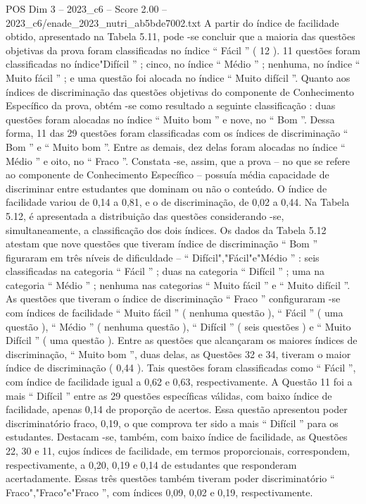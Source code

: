 \begin{textsample}{POS Dim 3 – 2023\_c6 – Score 2.00 – 2023\_c6/enade\_2023\_nutri\_ab5bde7002.txt}
A partir do índice de facilidade obtido, apresentado na Tabela 5.11, pode -se concluir que a maioria das questões objetivas da prova foram classificadas no índice “ Fácil ” ( 12 ). 11 questões foram classificadas no índice"Difícil ” ; cinco, no índice “ Médio ” ; nenhuma, no índice “ Muito fácil ” ; e uma questão foi alocada no índice “ Muito difícil ”.
Quanto aos índices de discriminação das questões objetivas do componente de Conhecimento Específico da prova, obtém -se como resultado a seguinte classificação : duas questões foram alocadas no índice “ Muito bom ” e nove, no “ Bom ”.
Dessa forma, 11 das 29 questões foram classificadas com os índices de discriminação “ Bom ” e “ Muito bom ”.
Entre as demais, dez delas foram alocadas no índice “ Médio ” e oito, no “ Fraco ”.
Constata -se, assim, que a prova – no que se refere ao componente de Conhecimento Específico – possuía média capacidade de discriminar entre estudantes que dominam ou não o conteúdo.
O índice de facilidade variou de 0,14 a 0,81, e o de discriminação, de 0,02 a 0,44.
Na Tabela 5.12, é apresentada a distribuição das questões considerando -se, simultaneamente, a classificação dos dois índices.
Os dados da Tabela 5.12 atestam que nove questões que tiveram índice de discriminação “ Bom ” figuraram em três níveis de dificuldade – “ Difícil","Fácil"e"Médio ” : seis classificadas na categoria “ Fácil ” ; duas na categoria “ Difícil ” ; uma na categoria “ Médio ” ; nenhuma nas categorias “ Muito fácil ” e “ Muito difícil ”.
As questões que tiveram o índice de discriminação “ Fraco ” configuraram -se com índices de facilidade “ Muito fácil ” ( nenhuma questão ), “ Fácil ” ( uma questão ), “ Médio ” ( nenhuma questão ), “ Difícil ” ( seis questões ) e “ Muito Difícil ” ( uma questão ).
Entre as questões que alcançaram os maiores índices de discriminação, “ Muito bom ”, duas delas, as Questões 32 e 34, tiveram o maior índice de discriminação ( 0,44 ).
Tais questões foram classificadas como “ Fácil ”, com índice de facilidade igual a 0,62 e 0,63, respectivamente.
A Questão 11 foi a mais “ Difícil ” entre as 29 questões específicas válidas, com baixo índice de facilidade, apenas 0,14 de proporção de acertos.
Essa questão apresentou poder discriminatório fraco, 0,19, o que comprova ter sido a mais “ Difícil ” para os estudantes.
Destacam -se, também, com baixo índice de facilidade, as Questões 22, 30 e 11, cujos índices de facilidade, em termos proporcionais, correspondem, respectivamente, a 0,20, 0,19 e 0,14 de estudantes que responderam acertadamente.
Essas três questões também tiveram poder discriminatório “ Fraco","Fraco"e"Fraco ”, com índices 0,09, 0,02 e 0,19, respectivamente.

\end{textsample}
